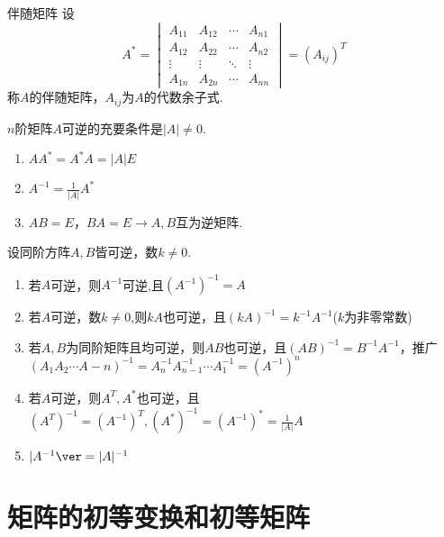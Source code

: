 \documentclass[lang=cn,10pt]{elegantbook}
\begin{document}
\begin{definition}{伴随矩阵}
设
    \begin{equation}
        A^{*} = \begin{vmatrix}
            A_{11}&A_{12}&\cdots&A_{n1}\\
            A_{12}&A_{22}&\cdots&A_{n2}\\
            \vdots&\vdots&\ddots&\vdots\\
            A_{1n}&A_{2n}&\cdots&A_{nn}
        \end{vmatrix} = (A_{ij})^T
    \end{equation}
称$A$的伴随矩阵，$A_{ij}$为$A$的代数余子式.
\end{definition}

\begin{theorem}
$n$阶矩阵$A$可逆的充要条件是$\vert A \vert \ne 0$.
\end{theorem}
\begin{property}
    \begin{enumerate}
    \item $AA^* = A^*A=\vert A \vert E$
    \item $A^{-1} = \frac{1}{\vert A \vert}A^{*}$
    \item $AB = E，BA=E \to A,B$互为逆矩阵. 
    \end{enumerate}
\end{property}


\begin{property}
    设同阶方阵$A,B$皆可逆，数$k \ne 0$.
    \begin{enumerate}
        \item 若$A$可逆，则$A^{-1}$可逆,且$(A^{-1})^{-1}=A$
        \item 若$A$可逆，数$k\ne 0 $,则$kA$也可逆，且$(kA)^{-1} = k^{-1} A^{-1}$($k$为非零常数)
        \item 若$A,B$为同阶矩阵且均可逆，则$AB$也可逆，且$(AB)^{-1} = B^{-1} A^{-1}$，推广\\
        $(A_1A_2 \cdots A-n)^{-1} = A_n^{-1}A_{n-1}^{-1}\cdots A_1^{-1} = (A^{-1})^{n}$
        \item 若$A$可逆，则$A^T,A^*$也可逆，且$(A^T)^{-1} = (A^{-1})^{T},(A^*)^{-1} = (A^{-1})^* = \frac{1}{\vert A \vert}A$
        \item $\vert A^{-1} \ver = \vert A \vert ^{-1}$
    \end{enumerate}
\end{property}

\section{矩阵的初等变换和初等矩阵}
\end{document}
